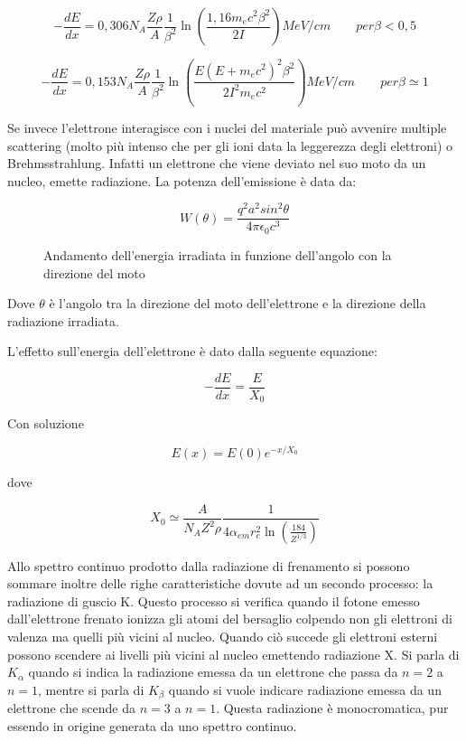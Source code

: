 \begin{equation}
-\frac{dE}{dx}=0,306 N_A\frac{Z\rho}{A}\frac{1}{\beta^2}\ln(\frac{1,16m_ec^2\beta^2}{2I}) MeV/cm\qquad per \beta<0,5
\end{equation}

\begin{equation}
-\frac{dE}{dx}=0,153 N_A\frac{Z\rho}{A}\frac{1}{\beta^2}\ln(\frac{E(E+m_ec^2)^2\beta^2}{2I^2m_ec^2}) MeV/cm \qquad per \beta\simeq 1
\end{equation}

Se invece l'elettrone interagisce con i nuclei del materiale può avvenire multiple scattering (molto più intenso che per gli ioni data la leggerezza degli elettroni) o Brehmsstrahlung. 
Infatti un elettrone che viene deviato nel suo moto da un nucleo, emette radiazione. La potenza dell'emissione è data da:

\begin{equation}
W(\theta)=\frac{q^2a^2sin^2\theta}{4\pi\epsilon_{0}c^3}
\end{equation}

\begin{figure}
\centering
		\caption{Andamento dell'energia irradiata in funzione dell'angolo con la direzione del moto}
         \label{brehmtheta}
\end{figure}

Dove $\theta$ è l'angolo tra la direzione del moto dell'elettrone e la direzione della radiazione irradiata.

L'effetto sull'energia dell'elettrone è dato dalla seguente equazione:

\begin{equation}
-\frac{dE}{dx}=\frac{E}{X_0}
\end{equation}

Con soluzione

\begin{equation}
E(x)=E(0)e^{-x/X_0}
\end{equation}

dove 

\begin{equation}
X_0\simeq\frac{A}{N_A Z^2 \rho}\frac{1}{4 \alpha_{em}r_e^2 \ln(\frac{184}{Z^{1/3}})}
\end{equation}

Allo spettro continuo prodotto dalla radiazione di frenamento si possono sommare inoltre delle righe caratteristiche dovute ad un secondo processo: la radiazione di guscio K. 
Questo processo si verifica quando il fotone emesso dall'elettrone frenato ionizza gli atomi del bersaglio colpendo non gli elettroni di valenza ma quelli più vicini al nucleo. Quando ciò succede gli elettroni esterni possono scendere ai livelli più vicini al nucleo emettendo radiazione X. Si parla di $K_{\alpha}$ quando si indica la radiazione emessa da un elettrone che passa da $n=2$ a $n=1$, mentre si parla di $K_{\beta}$ quando si vuole indicare radiazione emessa da un elettrone che scende da $n=3$ a $n=1$. Questa radiazione è monocromatica, pur essendo in origine generata da uno spettro continuo.


